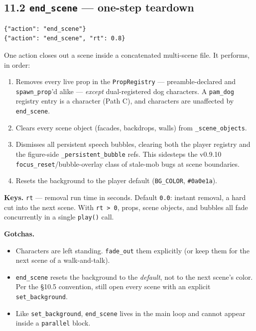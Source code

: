 \documentclass[
  12pt,
  letterpaper,
]{book}
\begin{document}
\subsection{\texorpdfstring{11.2 \texttt{end\_scene} --- one-step
teardown}{11.2 end\_scene --- one-step teardown}}\label{end-scene-one-step-teardown}

\begin{verbatim}
{"action": "end_scene"}
{"action": "end_scene", "rt": 0.8}
\end{verbatim}

One action closes out a scene inside a concatenated multi-scene file.
It performs, in order:

\begin{enumerate}
\item
  Removes every live prop in the \texttt{PropRegistry} ---
  preamble-declared and \texttt{spawn\_prop}'d alike --- \emph{except}
  dual-registered dog characters. A \texttt{pam\_dog} registry entry is
  a character (Path C), and characters are unaffected by
  \texttt{end\_scene}.
\item
  Clears every scene object (facades, backdrops, walls) from
  \texttt{\_scene\_objects}.
\item
  Dismisses all persistent speech bubbles, clearing both the player
  registry and the figure-side \texttt{\_persistent\_bubble} refs. This
  sidesteps the v0.9.10 \texttt{focus\_reset}/bubble-overlay class of
  stale-mob bugs at scene boundaries.
\item
  Resets the background to the player default (\texttt{BG\_COLOR},
  \texttt{\#0a0e1a}).
\end{enumerate}

\textbf{Keys.} \texttt{rt} --- removal run time in seconds. Default
\texttt{0.0}: instant removal, a hard cut into the next scene. With
\texttt{rt\ \textgreater{}\ 0}, props, scene objects, and bubbles all
fade concurrently in a single \texttt{play()} call.

\textbf{Gotchas.}

\begin{itemize}
\item
  Characters are left standing. \texttt{fade\_out} them explicitly (or
  keep them for the next scene of a walk-and-talk).
\item
  \texttt{end\_scene} resets the background to the \emph{default},
  not to the next scene's color. Per the §10.5 convention, still open
  every scene with an explicit \texttt{set\_background}.
\item
  Like \texttt{set\_background}, \texttt{end\_scene} lives in the main
  loop and cannot appear inside a \texttt{parallel} block.
\end{itemize}
\end{document}
